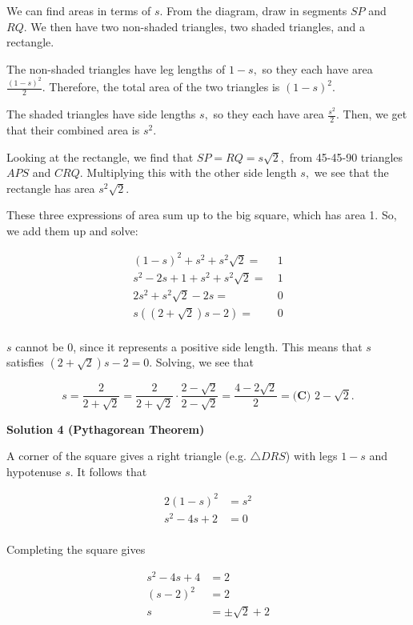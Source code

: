 \begin{enumerate}
We can find areas in terms of $s.$ From the diagram, draw in segments $SP$ and $RQ.$ We then have two non-shaded triangles, two shaded triangles, and a rectangle.

 The non-shaded triangles have leg lengths of $1-s,$ so they each have area $\frac{(1-s)^2}{2}.$ Therefore, the total area of the two triangles is $(1-s)^2.$ 

 The shaded triangles have side lengths $s,$ so they each have area $\frac{s^2}{2}.$ Then, we get that their combined area is $s^2.$

 Looking at the rectangle, we find that $SP=RQ=s\sqrt2,$ from 45-45-90 triangles $APS$ and $CRQ.$ Multiplying this with the other side length $s,$ we see that the rectangle has area $s^2\sqrt2.$

 These three expressions of area sum up to the big square, which has area 1. So, we add them up and solve:

 
 \begin{align*} (1-s)^2+s^2+s^2\sqrt2=&~1 \\ s^2-2s+1+s^2+s^2\sqrt2=&~1 \\ 2s^2+s^2\sqrt2-2s=&~0 \\ s((2+\sqrt2)s-2)=&~0 \\ \end{align*}

$s$ cannot be 0, since it represents a positive side length. This means that $s$ satisfies $(2+\sqrt2)s-2=0.$ Solving, we see that 

 
 \[s=\frac{2}{2+\sqrt2}=\frac{2}{2+\sqrt2}\cdot\frac{2-\sqrt2}{2-\sqrt2}=\frac{4-2\sqrt2}{2}=\boxed{\textbf{(C) }2-{\sqrt2}}.\]




\textbf{Solution 4 (Pythagorean Theorem)}

A corner of the square gives a right triangle (e.g. $\triangle DRS$) with legs $1-s$ and hypotenuse $s$. It follows that

 
 \begin{align*} 2(1-s)^2&=s^2 \\ s^2-4s+2&=0 \\ \end{align*}


 Completing the square gives

 
 \begin{align*} s^2-4s+4&=2 \\ (s-2)^2&=2 \\ s&=\pm \sqrt{2}+2 \\ \end{align*}



\end{enumerate}
